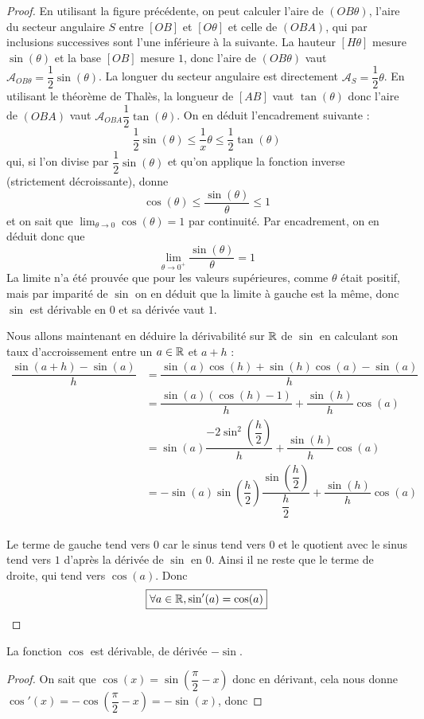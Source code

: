 \begin{proof}
    En utilisant la figure précédente, on peut calculer l'aire de $(OB\theta)$, l'aire du secteur angulaire $S$ entre $[OB]$ et $[O\theta]$ et celle de $(OBA)$, qui par inclusions successives sont l'une inférieure à la suivante. La hauteur $[H\theta]$ mesure $\sin(\theta)$ et la base $[OB]$ mesure $1$, donc l'aire de $(OB\theta)$ vaut $\mathcal A_{OB\theta} = \dfrac{1}{2}\sin(\theta)$. La longuer du secteur angulaire est directement $\mathcal A_S = \dfrac{1}{2}\theta$. En utilisant le théorème de Thalès, la longueur de $[AB]$ vaut $\tan(\theta)$ donc l'aire de $(OBA)$ vaut $\mathcal A_{OBA}\dfrac{1}{2}\tan(\theta)$. On en déduit l'encadrement suivante : $$\frac{1}{2}\sin(\theta)\leq \frac{1}{x}\theta\leq \frac{1}{2}\tan(\theta)$$ qui, si l'on divise par $\dfrac{1}{2}\sin(\theta)$ et qu'on applique la fonction inverse (strictement décroissante), donne $$\cos(\theta) \leq \frac{\sin(\theta)}{\theta}\leq 1$$ et on sait que $\displaystyle\lim_{\theta\to 0} \cos(\theta) = 1$ par continuité. Par encadrement, on en déduit donc que $$\boxed{\lim_{\theta\to0^+}\frac{\sin(\theta)}{\theta} = 1}$$ La limite n'a été prouvée que pour les valeurs supérieures, comme $\theta$ était positif, mais par imparité de $\sin$ on en déduit que la limite à gauche est la même, donc $\sin$ est dérivable en $0$ et sa dérivée vaut $1$.

    Nous allons maintenant en déduire la dérivabilité sur $\mathbb{R}$ de $\sin$ en calculant son taux d'accroissement entre un $a\in\mathbb{R}$ et $a+h$ :
    \begin{align*}
        \dfrac{\sin(a+h)-\sin(a)}{h} &= \dfrac{\sin(a)\cos(h)+\sin(h)\cos(a)-\sin(a)}{h}\\
        &= \dfrac{\sin(a)(\cos(h)-1)}{h} + \dfrac{\sin(h)}{h}\cos(a)\\
        &= \sin(a)\dfrac{-2\sin^2\left(\dfrac{h}{2}\right)}{h} + \dfrac{\sin(h)}{h}\cos(a)\\
        &= -\sin(a)\sin\left(\dfrac{h}{2}\right)\dfrac{\sin\left(\dfrac{h}{2}\right)}{\dfrac{h}{2}} + \dfrac{\sin(h)}{h}\cos(a)\\
    \end{align*}

    Le terme de gauche tend vers $0$ car le sinus tend vers $0$ et le quotient avec le sinus tend vers $1$ d'après la dérivée de $\sin$ en $0$. Ainsi il ne reste que le terme de droite, qui tend vers $\cos(a)$. Donc $$\boxed{\forall a\in\mathbb{R},\sin'(a) = \cos(a)}$$
\end{proof}

\begin{prop}
    La fonction $\cos$ est dérivable, de dérivée $-\sin$.
\end{prop}

\begin{proof}
    On sait que $\cos(x) = \sin\left(\dfrac{\pi}{2}-x\right)$ donc en dérivant, cela nous donne $\cos'(x) = -\cos\left(\dfrac{\pi}{2}-x\right) = -\sin(x)$, donc 
\end{proof}
